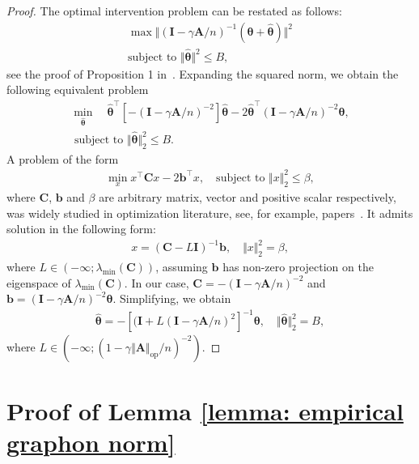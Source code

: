 \documentclass[11pt]{article}
\newcommand{\op}{\mathrm{op}}
\newcommand{\bA}{\bm{A}}
\newcommand{\bC}{\bm{C}}
\newcommand{\bb}{\bm{b}}
\newcommand{\btheta}{\bm{\theta}}
\newcommand{\bI}{\bm{I}}
\newcommand{\<}{\langle}
\renewcommand{\>}{\rangle}
\theoremstyle{plain}
\theoremstyle{definition}
\theoremstyle{remark}
\begin{document}
{\begin{proof}
    The optimal intervention problem can be restated as follows:
    \begin{align*}
        \max \Vert (\bI - \gamma \bA / n)^{-1} (\btheta + \widehat{\btheta}) \Vert^2 \\
        \text{subject to } \Vert \widehat{\btheta} \Vert^2 \le B,
    \end{align*}
    see the proof of Proposition 1 in~\citep{Parise_Ozdaglar_Econometrica}. Expanding the squared norm, we obtain the following equivalent problem
    \begin{align*}
        \min_{\widehat{\btheta}} \quad \widehat{\btheta}^\top \left [ - (\bI - \gamma \bA / n)^{-2}\right ] \widehat{\btheta} - 2 \widehat{\btheta}^\top (\bI - \gamma \bA/n)^{-2} \btheta, \\
        \text{ subject to } \Vert \widehat{\btheta} \Vert^2_2 \le B.
    \end{align*}
    A problem of the form
    \begin{align*}
        \min_{x} x^\top \bC x - 2 \bb^\top x,  \quad \text{subject to } \Vert x \Vert^2_2 \le \beta,
    \end{align*}
    where $\bC$, $\bb$ and $\beta$ are arbitrary matrix, vector and positive scalar respectively,
    was widely studied in optimization literature, see, for example, papers~\citep{opt_forsythe1965stationary, gander1989constrained, opt_more2006levenberg}. It admits solution in the following form:
    \begin{align*}
        x = (\bC - L \bI)^{-1} \bb, \quad \Vert x \Vert^2_2 = \beta,
    \end{align*}
    where $L \in (-\infty; \lambda_{\min}(\bC))$, assuming $\bb$ has non-zero projection on the eigenspace of $\lambda_{\min}(\bC)$. In our case, $\bC = - (\bI - \gamma \bA / n)^{-2}$ and $\bb = (\bI - \gamma \bA/n)^{-2} \btheta$. Simplifying, we obtain
    \begin{align*}
        \widehat{\btheta} = - \left [ (\bI + L(\bI - \gamma \bA /n)^2 \right ]^{-1} \btheta, \quad \Vert \widehat{\btheta} \Vert^2_2 = B,
    \end{align*}
    where $L \in \left (-\infty; (1 - \gamma \Vert \bA \Vert_{\op} / n)^{-2} \right)$.
\end{proof}





\section{Proof of Lemma \ref{lemma: empirical graphon norm}}
\label{appendix: proof of empirical graphon lemma}



}
\end{document}
